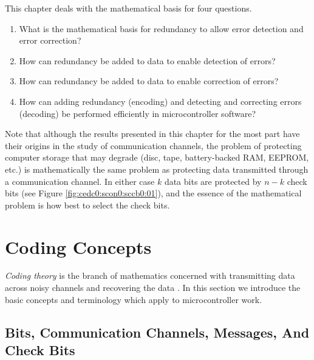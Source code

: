 This chapter deals with the mathematical basis for four
questions.

\begin{enumerate}
\item What is the mathematical basis for redundancy to allow error
      detection and error correction?
\item How can redundancy be added to data to enable detection of errors?
\item How can redundancy be added to data to enable correction of
      errors?
\item How can adding redundancy (encoding) and detecting and correcting
      errors (decoding) be performed efficiently in 
      microcontroller software?
\end{enumerate}

Note that although the results presented in this chapter for the most part
have their origins in the study of communication channels, the problem of 
protecting computer storage that may degrade (disc, tape, battery-backed RAM,
EEPROM, etc.) is mathematically the same problem as protecting data transmitted
through a communication channel.  In either case $k$ data bits are protected
by $n-k$ check bits (see Figure \ref{fig:cedc0:scon0:sccb0:01}), 
and the essence of the mathematical problem is how best to
select the check bits.


\section{Coding Concepts}
\label{cedc0:scon0}

\emph{Coding theory} is the branch of mathematics 
concerned with transmitting data across noisy channels and recovering
the data \cite{bibref:w:ctfirst50}.  In this section we introduce the
basic concepts and terminology which apply to microcontroller work.


\subsection{Bits, Communication Channels, Messages, And Check Bits}
\label{cedc0:scon0:sccb0}

